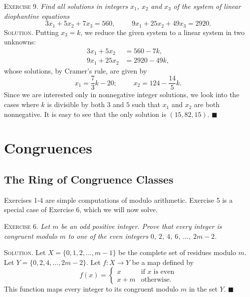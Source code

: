 \documentclass[11pt, leqno]{article}
\newcommand{\done}{\ensuremath{\blacksquare}}
\begin{document}
\textsc{Exercise 9}. \emph{Find all solutions in integers $x_1$, $x_2$ and $x_3$ of the system of linear diophantine equations 
\begin{displaymath}
  3x_1 + 5x_2 + 7x_3 = 560, \hspace{1cm}
  9x_1 + 25x_2 + 49x_3 = 2920.
\end{displaymath}}\textsc{Solution}. Putting $x_3 = k$, we reduce the given system to a linear system in two unknowns: 
\begin{align*}
  3x_1 + 5x_2 &= 560 - 7k, \\
  9x_1 + 25x_2 &= 2920 - 49k,
\end{align*}
whose solutions, by Cramer's rule, are given by 
\begin{displaymath}
x_1 = \frac{7}{3}k - 20; \hspace{1cm} x_2 = 124 - \frac{14}{5}k.
\end{displaymath}
Since we are interested only in nonnegative integer solutions, we look into the cases where $k$ is divisible by both $3$ and $5$ such that $x_1$ and $x_2$ are both nonnegative. It is easy to see that the only solution is $(15, 82, 15)$. \done

\section{Congruences}

\subsection{The Ring of Congruence Classes}

Exercises 1-4 are simple computations of modulo arithmetic. Exercise 5 is a special case of Exercise 6, which we will now solve.

\textsc{Exercise 6}. \emph{Let $m$ be an odd positive integer. Prove that every integer is congruent modulo $m$ to one of the even integers $0$, $2$, $4$, $6$, $\ldots$, $2m-2$.}

\textsc{Solution}. Let $X=\{0,1,2,\ldots,m-1\}$ be the complete set of residues modulo $m$. Let $Y=\{0,2,4,\ldots,2m-2\}$. Let $f: X \to Y$ be a map defined by 
\begin{displaymath}
  f(x) = \begin{cases}
    x & \text{if } x \text{ is even} \\
    x+m & \text{otherwise.}
  \end{cases}
\end{displaymath}
This function maps every integer to its congruent modulo $m$ in the set $Y$. \done
\end{document}
